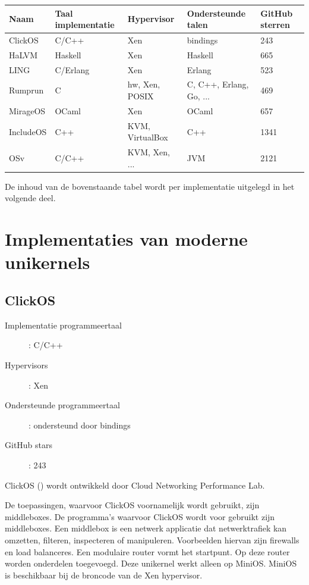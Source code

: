 \documentclass[pdftex,a4paper,12pt,twoside]{report}
\begin{document}
{\footnotesize
\begin{center}
    \begin{tabular}{| l | l | l | l | l |}
    \hline
    Naam & Taal implementatie & Hypervisor & Ondersteunde talen & GitHub sterren \\ \hline
    ClickOS & C/C++ & Xen & bindings & 243 \\ \hline
    HaLVM & Haskell & Xen & Haskell & 665 \\ \hline
    LING & C/Erlang & Xen & Erlang & 523 \\ \hline
    Rumprun & C & hw, Xen, POSIX & C, C++, Erlang, Go, ... & 469 \\ \hline
    MirageOS & OCaml & Xen & OCaml & 657 \\ \hline
    IncludeOS & C++ & KVM, VirtualBox & C++ & 1341 \\ \hline
    OSv & C/C++ & KVM, Xen, ... & JVM & 2121 \\ \hline
    \end{tabular}
\end{center} 
}

De inhoud van de bovenstaande tabel wordt per implementatie uitgelegd in het volgende deel.

\newpage

\section{Implementaties van moderne unikernels}

\subsection{ClickOS}
\begin{description}
  \item [Implementatie programmeertaal]: C/C++
  \item [Hypervisors]: Xen
  \item [Ondersteunde programmeertaal]: ondersteund door bindings
  \item [GitHub stars]: 243
\end{description}

ClickOS  (\cite{martins_clickos_2014}) wordt ontwikkeld door Cloud Networking Performance Lab.

De toepassingen, waarvoor ClickOS voornamelijk wordt gebruikt, zijn middleboxes. De programma's waarvoor ClickOS wordt voor gebruikt zijn middleboxes. Een middlebox is een netwerk applicatie dat netwerktrafiek kan omzetten, filteren, inspecteren of manipuleren. Voorbeelden hiervan zijn firewalls en load balanceres.
Een modulaire router vormt het startpunt. Op deze router worden onderdelen toegevoegd. Deze unikernel werkt alleen op MiniOS. MiniOS is beschikbaar bij de broncode van de Xen hypervisor.
\end{document}

